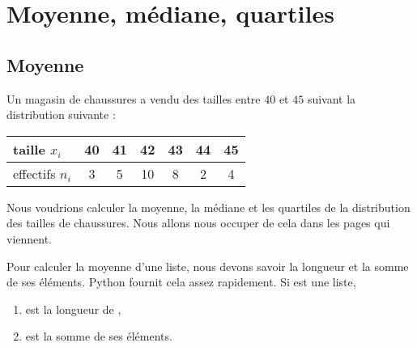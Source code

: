 \section{Moyenne, médiane, quartiles}
\label{SecZYftar}

\subsection{Moyenne}

\begin{example}     \label{ExerfDMnv}
    Un magasin de chaussures a vendu des tailles entre \( 40\) et \( 45\) suivant la distribution suivante :
    \begin{center}
        \begin{tabular}{|l||c|c|c|c|c|c|}
            \hline
            taille \( x_i\)&40&41&42&43&44&45\\
            \hline
            effectifs \( n_i\)&3&5&10&8&2&4\\
            \hline
        \end{tabular}
    \end{center}
    Nous voudrions calculer la moyenne, la médiane et les quartiles de la distribution des tailles de chaussures. Nous allons nous occuper de cela dans les pages qui viennent.
\end{example}
    
    Pour calculer la moyenne d'une liste, nous devons savoir la longueur et la somme de ses éléments. Python fournit cela assez rapidement. Si  est une liste,
    \begin{enumerate}
        \item
             est la longueur de ,
        \item
             est la somme de ses éléments.
    \end{enumerate}
    
